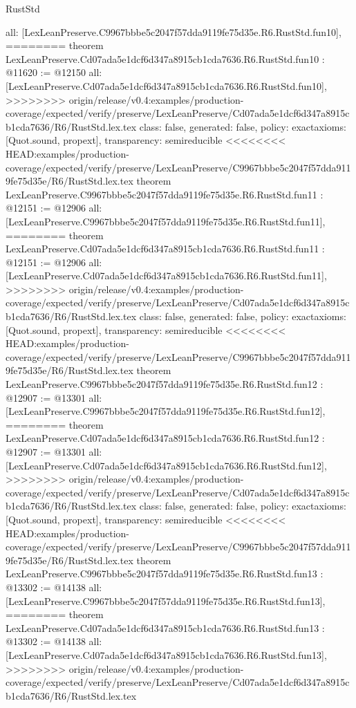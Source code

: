 \begin{lexlean}{RustStd}
\begin{coremodule}
{\begin{coremodule}
{{{{{{{{{{{{{  all: [LexLeanPreserve.C9967bbbe5c2047f57dda9119fe75d35e.R6.RustStd.fun10],
========
theorem LexLeanPreserve.Cd07ada5e1dcf6d347a8915cb1cda7636.R6.RustStd.fun10 : @11620 := @12150 {
  all: [LexLeanPreserve.Cd07ada5e1dcf6d347a8915cb1cda7636.R6.RustStd.fun10],
>>>>>>>> origin/release/v0.4:examples/production-coverage/expected/verify/preserve/LexLeanPreserve/Cd07ada5e1dcf6d347a8915cb1cda7636/R6/RustStd.lex.tex
  class: false,
  generated: false,
  policy: exact{axioms: [Quot.sound, propext]},
  transparency: semireducible
}
<<<<<<<< HEAD:examples/production-coverage/expected/verify/preserve/LexLeanPreserve/C9967bbbe5c2047f57dda9119fe75d35e/R6/RustStd.lex.tex
theorem LexLeanPreserve.C9967bbbe5c2047f57dda9119fe75d35e.R6.RustStd.fun11 : @12151 := @12906 {
  all: [LexLeanPreserve.C9967bbbe5c2047f57dda9119fe75d35e.R6.RustStd.fun11],
========
theorem LexLeanPreserve.Cd07ada5e1dcf6d347a8915cb1cda7636.R6.RustStd.fun11 : @12151 := @12906 {
  all: [LexLeanPreserve.Cd07ada5e1dcf6d347a8915cb1cda7636.R6.RustStd.fun11],
>>>>>>>> origin/release/v0.4:examples/production-coverage/expected/verify/preserve/LexLeanPreserve/Cd07ada5e1dcf6d347a8915cb1cda7636/R6/RustStd.lex.tex
  class: false,
  generated: false,
  policy: exact{axioms: [Quot.sound, propext]},
  transparency: semireducible
}
<<<<<<<< HEAD:examples/production-coverage/expected/verify/preserve/LexLeanPreserve/C9967bbbe5c2047f57dda9119fe75d35e/R6/RustStd.lex.tex
theorem LexLeanPreserve.C9967bbbe5c2047f57dda9119fe75d35e.R6.RustStd.fun12 : @12907 := @13301 {
  all: [LexLeanPreserve.C9967bbbe5c2047f57dda9119fe75d35e.R6.RustStd.fun12],
========
theorem LexLeanPreserve.Cd07ada5e1dcf6d347a8915cb1cda7636.R6.RustStd.fun12 : @12907 := @13301 {
  all: [LexLeanPreserve.Cd07ada5e1dcf6d347a8915cb1cda7636.R6.RustStd.fun12],
>>>>>>>> origin/release/v0.4:examples/production-coverage/expected/verify/preserve/LexLeanPreserve/Cd07ada5e1dcf6d347a8915cb1cda7636/R6/RustStd.lex.tex
  class: false,
  generated: false,
  policy: exact{axioms: [Quot.sound, propext]},
  transparency: semireducible
}
<<<<<<<< HEAD:examples/production-coverage/expected/verify/preserve/LexLeanPreserve/C9967bbbe5c2047f57dda9119fe75d35e/R6/RustStd.lex.tex
theorem LexLeanPreserve.C9967bbbe5c2047f57dda9119fe75d35e.R6.RustStd.fun13 : @13302 := @14138 {
  all: [LexLeanPreserve.C9967bbbe5c2047f57dda9119fe75d35e.R6.RustStd.fun13],
========
theorem LexLeanPreserve.Cd07ada5e1dcf6d347a8915cb1cda7636.R6.RustStd.fun13 : @13302 := @14138 {
  all: [LexLeanPreserve.Cd07ada5e1dcf6d347a8915cb1cda7636.R6.RustStd.fun13],
>>>>>>>> origin/release/v0.4:examples/production-coverage/expected/verify/preserve/LexLeanPreserve/Cd07ada5e1dcf6d347a8915cb1cda7636/R6/RustStd.lex.tex
}}}}}}}}}}}}}}}}}
\end{coremodule}}
\end{coremodule}
\end{lexlean}
